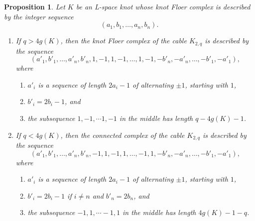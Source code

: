 \documentclass[11pt, reqno]{amsart}
\newtheorem{proposition}[theorem]{Proposition}
\theoremstyle{definition}
\theoremstyle{remark}
\numberwithin{equation}{section}
\begin{document}
%

%






\begin{proposition}\label{prop:cableL}
Let $K$ be an L-space knot whose knot Floer complex is described by the integer sequence $$(a_1, b_1, \dots, a_n, b_n).$$
\begin{enumerate}
	\item\label{it:cableL1} If $q > 4g(K)$, then the knot Floer complex of the cable $K_{2,q}$ is described by the sequence
	\[ (a'_1, b'_1, \dots, a'_n, b'_n, 1, -1, 1, -1, \dots, 1, -1, -b'_n, -a'_n, \dots, -b'_1, -a'_1), \]
	where 
	\begin{enumerate}
		\item $a'_i$ is a sequence of length $2a_i-1$ of alternating $\pm 1$, starting with $1$,
		\item $b'_i = 2b_i-1$, and
		\item the subsequence $1, -1, \dotsm 1, -1$ in the middle has length $q-4g(K)-1$.
	\end{enumerate}
	\item\label{it:cableL2} If $q < 4g(K)$, then the connected complex of the cable $K_{2,q}$ is described by the sequence
	\[ (a'_1, b'_1, \dots, a'_n, b'_n, -1, 1, -1, 1, \dots, -1, 1, -b'_n, -a'_n, \dots, -b'_1, -a'_1), \]
	where 
	\begin{enumerate}
		\item $a'_i$ is a sequence of length $2a_i-1$ of alternating $\pm 1$, starting with $1$,
		\item $b'_i = 2b_i-1$ if $i \neq n$ and $b'_n = 2b_n$, and
		\item the subsequence $-1, 1, \dotsm -1, 1$ in the middle has length $4g(K)-1-q$.
	\end{enumerate}
\end{enumerate}
\end{proposition}
\end{document}
